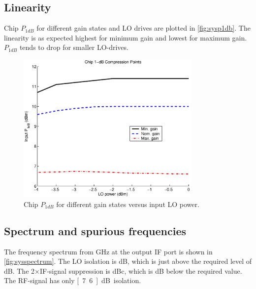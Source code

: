 		\subsection{Linearity}
			Chip $P_{1dB}$ for different gain states and LO drives are plotted in \autoref{fig:sysp1db}. The linearity is as expected highest for minimum gain and lowest for maximum gain. $P_{1dB}$ tends to drop for smaller LO-drives. 
			
			
			\begin{figure}[hbt!]
				\centering
				\includegraphics[width=0.8\textwidth]{fig/summary/chipp1db}
				\caption[Chip $P_{1dB}$.]{Chip $P_{1dB}$ for different gain states versus input LO power.}\label{fig:sysp1db}
			\end{figure}
			
		\subsection{Spectrum and spurious frequencies}
			The frequency spectrum from \unit[0 to 10]{GHz} at the output IF port is shown in \autoref{fig:sysspectrum}. The LO isolation is \unit[21]{dB}, which is just above the required level of \unit[20]{dB}. The 2$\times$IF-signal suppression is \unit[38]{dBc}, which is \unit[2]{dB} below the required value. The RF-signal has only \unit[7.6]{dB} isolation.
			

